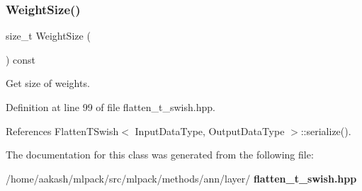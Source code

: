 \subsubsection{Weight\+Size()}
{\footnotesize\ttfamily size\+\_\+t Weight\+Size (\begin{DoxyParamCaption}{ }\end{DoxyParamCaption}) const\hspace{0.3cm}{\ttfamily [inline]}}



Get size of weights. 



Definition at line 99 of file flatten\+\_\+t\+\_\+swish.\+hpp.



References Flatten\+T\+Swish$<$ Input\+Data\+Type, Output\+Data\+Type $>$\+::serialize().



The documentation for this class was generated from the following file\+:\begin{DoxyCompactItemize}
\item 
/home/aakash/mlpack/src/mlpack/methods/ann/layer/\textbf{ flatten\+\_\+t\+\_\+swish.\+hpp}\end{DoxyCompactItemize}

